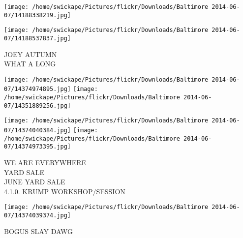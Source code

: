 \documentclass[10pt,letterpaper]{article}
\begin{document}
\texttt{[image: /home/swickape/Pictures/flickr/Downloads/Baltimore 2014-06-07/14188338219.jpg]}

\vspace{0.25in}
\texttt{[image: /home/swickape/Pictures/flickr/Downloads/Baltimore 2014-06-07/14188537837.jpg]}

JOEY AUTUMN\\
WHAT A LONG\\
\pagebreak

\texttt{[image: /home/swickape/Pictures/flickr/Downloads/Baltimore 2014-06-07/14374974895.jpg]}
\texttt{[image: /home/swickape/Pictures/flickr/Downloads/Baltimore 2014-06-07/14351889256.jpg]}

\texttt{[image: /home/swickape/Pictures/flickr/Downloads/Baltimore 2014-06-07/14374040384.jpg]}
\texttt{[image: /home/swickape/Pictures/flickr/Downloads/Baltimore 2014-06-07/14374973395.jpg]}

WE ARE EVERYWHERE\\
YARD SALE\\
JUNE YARD SALE\\
4.1.0. KRUMP WORKSHOP/SESSION\\
\pagebreak

\texttt{[image: /home/swickape/Pictures/flickr/Downloads/Baltimore 2014-06-07/14374039374.jpg]}

BOGUS SLAY DAWG\\
\pagebreak
\end{document}

